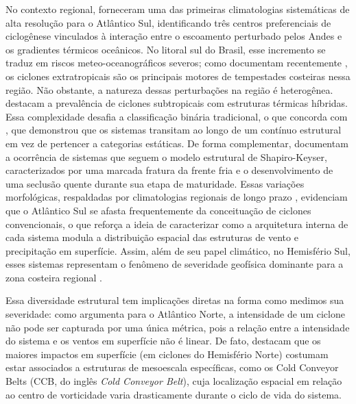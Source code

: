 No contexto regional, \citet{reboita2010south} forneceram uma das primeiras climatologias sistemáticas de alta resolução para o Atlântico Sul, identificando três centros preferenciais de ciclogênese vinculados à interação entre o escoamento perturbado pelos Andes e os gradientes térmicos oceânicos.
No litoral sul do Brasil, esse incremento se traduz em riscos meteo-oceanográficos severos; como documentam recentemente \citet{miranda2026patterns}, os ciclones extratropicais são os principais motores de tempestades costeiras nessa região.
Não obstante, a natureza dessas perturbações na região é heterogênea. \citet{evans2012climatology} destacam a prevalência de ciclones subtropicais com estruturas térmicas híbridas. Essa complexidade desafia a classificação binária tradicional, o que concorda com \citet{hart2003cyclone}, que demonstrou que os sistemas transitam ao longo de um contínuo estrutural em vez de pertencer a categorias estáticas. De forma complementar, \citet{gozzo2013air} documentam a ocorrência de sistemas que seguem o modelo estrutural de Shapiro-Keyser, caracterizados por uma marcada fratura da frente fria e o desenvolvimento de uma seclusão quente durante sua etapa de maturidade. Essas variações morfológicas, respaldadas por climatologias regionais de longo prazo \citep{gozzo2014subtropical}, evidenciam que o Atlântico Sul se afasta frequentemente da conceituação de ciclones convencionais, o que reforça a ideia de caracterizar como a arquitetura interna de cada sistema modula a distribuição espacial das estruturas de vento e precipitação em superfície. Assim, além de seu papel climático, no Hemisfério Sul, esses sistemas representam o fenômeno de severidade geofísica dominante para a zona costeira regional \citep{gramcianinov2023impact}.

Essa diversidade estrutural tem implicações diretas na forma como medimos sua severidade: como argumenta \citet{corner2025classification} para o Atlântico Norte, a intensidade de um ciclone não pode ser capturada por uma única métrica, pois a relação entre a intensidade do sistema e os ventos em superfície não é linear. De fato, \citet{eisenstein2023identification} destacam que os maiores impactos em superfície (em ciclones do Hemisfério Norte) costumam estar associados a estruturas de mesoescala específicas, como os Cold Conveyor Belts (CCB, do inglês \textit{Cold Conveyor Belt}), cuja localização espacial em relação ao centro de vorticidade varia drasticamente durante o ciclo de vida do sistema.

